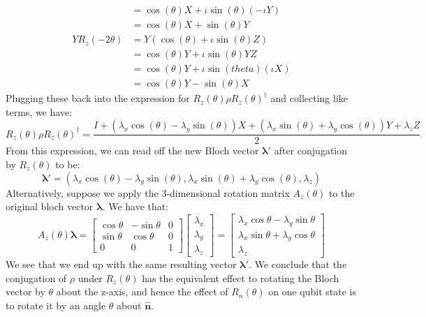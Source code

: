 \begin{example}
\begin{align*}
        &=\cos(\theta)X+\iota \sin(\theta)(-\iota Y)\\
        &=\cos(\theta)X+\sin(\theta)Y\\
        YR_z(-2\theta)&=Y(\cos(\theta)+\iota \sin(\theta)Z)\\
        &=\cos(\theta)Y+\iota \sin(\theta)YZ\\
        &=\cos(\theta)Y+\iota \sin(theta)(\iota X)\\
        &=\cos(\theta)Y-\sin(\theta)X
    \end{align*}
    Plugging these back into the expression for $R_z(\theta)\rho R_z(\theta)^{\dagger}$ and collecting like terms, we have:
    \[
    R_z(\theta)\rho R_z(\theta)^{\dagger}=\frac{I+(\lambda_x\cos(\theta)-\lambda_y\sin(\theta))X+(\lambda_x\sin(\theta)+\lambda_y\cos(\theta))Y+\lambda_zZ}{2}
    \]
    From this expression, we can read off the new Bloch vector $\mathbf{\lambda'}$ after conjugation by $R_z(\theta)$ to be:
    \[
    \mathbf{\lambda'}=(\lambda_x\cos(\theta)-\lambda_y \sin(\theta),\lambda_x\sin(\theta)+\lambda_y\cos(\theta),\lambda_z)
    \]
    Alternatively, suppose we apply the 3-dimensional rotation matrix $A_z(\theta)$ to the original bloch vector $\mathbf{\lambda}$. We have that:
    \[
    A_z(\theta)\mathbf{\lambda}=\begin{bmatrix}\cos\theta & -\sin\theta & 0 \\ \sin\theta & \cos\theta & 0 \\ 0 & 0 & 1 \end{bmatrix} \begin{bmatrix} \lambda_x \\ \lambda_y \\ \lambda_z \end{bmatrix}=\begin{bmatrix} \lambda_x \cos\theta-\lambda_y \sin\theta \\ \lambda_x\sin\theta+\lambda_y \cos\theta \\ \lambda_z \end{bmatrix}
    \]
    We see that we end up with the same resulting vector $\mathbf{\lambda'}$. We conclude that the conjugation of $\rho$ under $R_z(\theta)$ has the equivalent effect to rotating the Bloch vector by $\theta$ about the z-axis, and hence the effect of $R_n(\theta)$ on one qubit state is to rotate it by an angle $\theta$ about $\hat{\mathbf{n}}$.

\end{example}
